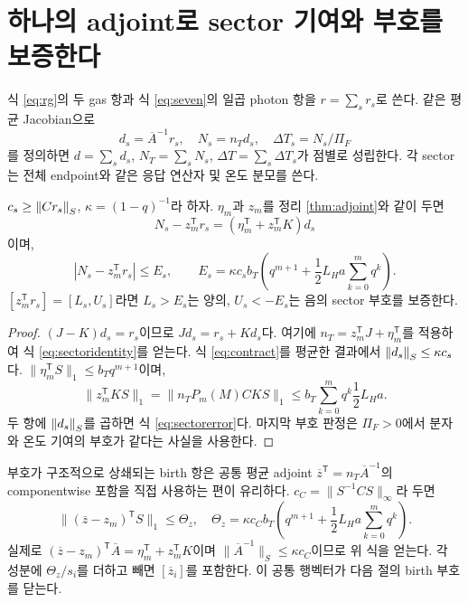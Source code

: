 \section{하나의 adjoint로 sector 기여와 부호를 보증한다}\label{sec:sector}
식 \eqref{eq:rg}의 두 gas 항과 식 \eqref{eq:seven}의 일곱 photon 항을 $r=\sum_s r_s$로 쓴다. 같은 평균 Jacobian으로
\begin{equation}
d_s=\overline A^{-1}r_s,\quad N_s=n_Td_s,\quad
\Delta T_s=N_s/\Pi_F
\label{eq:sectordef}
\end{equation}
를 정의하면 $d=\sum_sd_s$, $N_T=\sum_sN_s$, $\Delta T=\sum_s\Delta T_s$가 점별로 성립한다. 각 sector는 전체 endpoint와 같은 응답 연산자 및 온도 분모를 쓴다.

\begin{theorem}\label{thm:sector}
$c_s\ge\left\lVert Cr_s\right\rVert_S$, $\kappa=(1-q)^{-1}$라 하자. $\eta_m$과 $z_m$를 정리 \ref{thm:adjoint}와 같이 두면
\begin{equation}
N_s-z_m^{\mathsf T}r_s=(\eta_m^{\mathsf T}+z_m^{\mathsf T}K)d_s
\label{eq:sectoridentity}
\end{equation}
이며,
\begin{equation}
|N_s-z_m^{\mathsf T}r_s|\le E_s,
\qquad E_s=\kappa c_sb_T\left(q^{m+1}
+\frac12L_Ha\sum_{k=0}^mq^k\right).
\label{eq:sectorerror}
\end{equation}
$[z_m^{\mathsf T}r_s]=[L_s,U_s]$라면 $L_s>E_s$는 양의, $U_s<-E_s$는 음의 sector 부호를 보증한다.
\end{theorem}
\begin{proof}
$(J-K)d_s=r_s$이므로 $Jd_s=r_s+Kd_s$다. 여기에 $n_T=z_m^{\mathsf T}J+\eta_m^{\mathsf T}$를 적용하여 식 \eqref{eq:sectoridentity}를 얻는다. 식 \eqref{eq:contract}를 평균한 결과에서 $\left\lVert d_s\right\rVert_S\le\kappa c_s$다. $\|\eta_m^{\mathsf T}S\|_1\le b_Tq^{m+1}$이며,
\[
\|z_m^{\mathsf T}KS\|_1
=\|n_TP_m(M)CKS\|_1
\le b_T\sum_{k=0}^mq^k\frac12L_Ha.
\]
두 항에 $\left\lVert d_s\right\rVert_S$를 곱하면 식 \eqref{eq:sectorerror}다. 마지막 부호 판정은 $\Pi_F>0$에서 분자와 온도 기여의 부호가 같다는 사실을 사용한다.
\end{proof}

부호가 구조적으로 상쇄되는 birth 항은 공통 평균 adjoint
$\overline z^{\mathsf T}=n_T\overline A^{-1}$의 componentwise 포함을 직접 사용하는 편이 유리하다. $c_C=\|S^{-1}CS\|_\infty$라 두면
\begin{equation}
\| (\overline z-z_m)^{\mathsf T}S\|_1\le\Theta_z,
\quad\Theta_z=\kappa c_Cb_T\left(q^{m+1}
+\frac12L_Ha\sum_{k=0}^mq^k\right).
\label{eq:adjointrow}
\end{equation}
실제로 $(\overline z-z_m)^{\mathsf T}\overline A=\eta_m^{\mathsf T}+z_m^{\mathsf T}K$이며 $\|\overline A^{-1}\|_S\le\kappa c_C$이므로 위 식을 얻는다. 각 성분에 $\Theta_z/s_i$를 더하고 빼면 $[\overline z_i]$를 포함한다. 이 공통 행벡터가 다음 절의 birth 부호를 닫는다.
